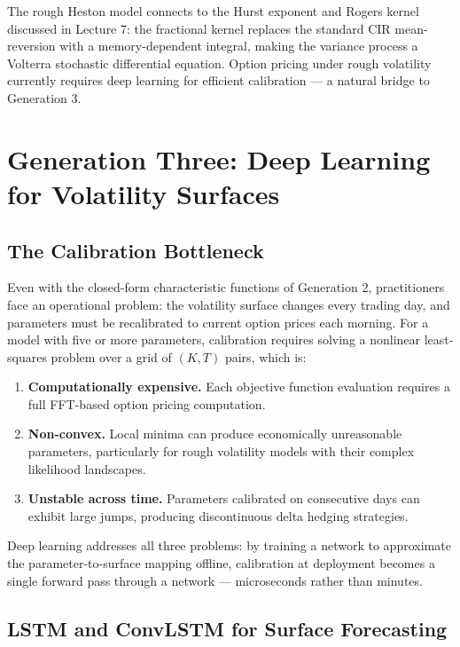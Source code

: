 \documentclass[12pt, a4paper]{article}
\begin{document}
The rough Heston model connects to the Hurst exponent and Rogers kernel
discussed in Lecture 7: the fractional kernel replaces the standard
CIR mean-reversion with a memory-dependent integral, making the variance
process a Volterra stochastic differential equation. Option pricing
under rough volatility currently requires deep learning for efficient
calibration --- a natural bridge to Generation 3.

\section{Generation Three: Deep Learning for Volatility Surfaces}

\subsection{The Calibration Bottleneck}

Even with the closed-form characteristic functions of Generation 2,
practitioners face an operational problem: the volatility surface
changes every trading day, and parameters must be recalibrated to
current option prices each morning. For a model with five or more
parameters, calibration requires solving a nonlinear least-squares
problem over a grid of $(K, T)$ pairs, which is:
\begin{enumerate}[label=(\roman*)]
  \item \textbf{Computationally expensive.} Each objective function
        evaluation requires a full FFT-based option pricing computation.
  \item \textbf{Non-convex.} Local minima can produce economically
        unreasonable parameters, particularly for rough volatility
        models with their complex likelihood landscapes.
  \item \textbf{Unstable across time.} Parameters calibrated on
        consecutive days can exhibit large jumps, producing
        discontinuous delta hedging strategies.
\end{enumerate}

Deep learning addresses all three problems: by training a network to
approximate the parameter-to-surface mapping offline, calibration at
deployment becomes a single forward pass through a network ---
microseconds rather than minutes.

\subsection{LSTM and ConvLSTM for Surface Forecasting}
\end{document}
